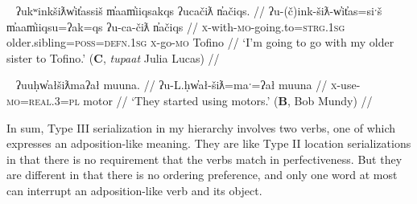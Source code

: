 \ex~ \label{ex:starttobewith}
\begingl
\glpreamble ʔukʷinkšiƛw̓it̓assiš m̓aam̓iiqsakqs ʔucačiƛ n̓ačiqs. //
\gla ʔu-(č)ink-šiƛ-w̓it̓as=siˑš m̓aam̓iiqsu=ʔak=qs ʔu-ca-čiƛ n̓ačiqs //
\glb \textsc{x}-with-\textsc{mo}-going.to=\textsc{strg.1sg} older.sibling=\textsc{poss}=\textsc{defn.1sg} \textsc{x}-go-\textsc{mo} Tofino //
\glft `I'm going to go with my older sister to Tofino.' (\textbf{C}, \textit{tupaat} Julia Lucas) //
\endgl
\xe

\ex~ \label{ex:starttouse}
\begingl
\glpreamble ʔuuḥw̓ałšiƛmaʔał muuna. //
\gla ʔu-L.ḥw̓ał-šiƛ=maˑ=ʔał muuna //
\glb \textsc{x}-use-\textsc{mo}=\textsc{real.3}=\textsc{pl} motor //
\glft `They started using motors.' (\textbf{B}, Bob Mundy) //
\endgl
\xe

In sum, Type III serialization in my hierarchy involves two verbs, one of which expresses an adposition-like meaning. They are like Type II location serializations in that there is no requirement that the verbs match in perfectiveness. But they are different in that there is no ordering preference, and only one word at most can interrupt an adposition-like verb and its object.


\vspace{10pt}

\begin{comment}
\subsubsection{IV. Transitive-Intransitive Repetition}

\vspace{10pt}

Nuuchahnulth has a series of words with similar or identical meanings that differ only or mostly in transitivity. These include transitive and intransitive eat (\textit{-!iis} and \textit{haʔuk}, as in \ref{ex:eateat}) and cry and cry for (\textit{ʕiḥak} and \textit{ʔuʔuuy̓uk}, as in \ref{ex:crycry}). Speakers frequently will use both versions in a sentence.

While \textit{waa} `say' can be used as a transitive quotative, it can be used intransitively as well, similar to English \textit{speak}. It can enter into this kind of SVC in this capacity, doubling with another verb of speaking (\ref{ex:sayabout}). This characteristic doubling can also occur with \textit{ʔiiqḥuk} `tell' (\ref{ex:talkabout}).

\end{comment}

